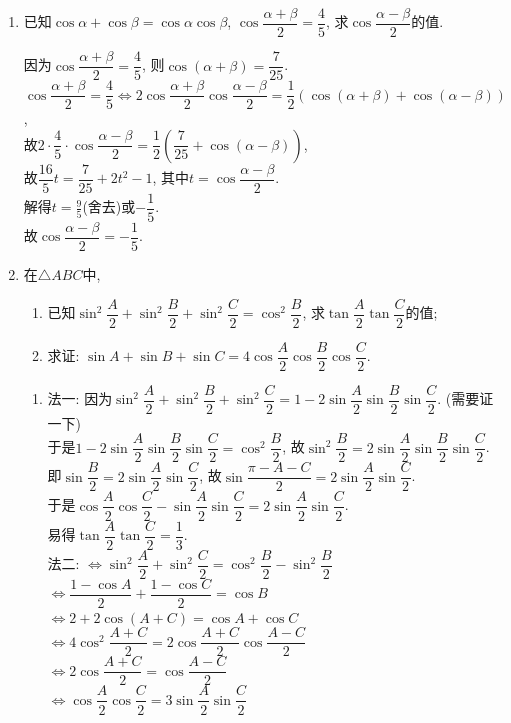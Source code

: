 \begin{enumerate}
\item 已知$\cos\alpha+\cos\beta=\cos\alpha\cos\beta$, $\cos\dfrac{\alpha+\beta}{2}=\dfrac{4}{5}$, 求$\cos\dfrac{\alpha-\beta}{2}$的值. 
\begin{jieda}
因为$\cos\dfrac{\alpha+\beta}{2}=\dfrac{4}{5}$, 则$\cos(\alpha+\beta)=\dfrac{7}{25}$. \\
$\cos\dfrac{\alpha+\beta}{2}=\dfrac{4}{5}\iff 2\cos\dfrac{\alpha+\beta}{2}\cos\dfrac{\alpha-\beta}{2}=\dfrac{1}{2}(\cos(\alpha+\beta)+\cos(\alpha-\beta))$, \\
故$2\cdot\dfrac{4}{5}\cdot\cos\dfrac{\alpha-\beta}{2}=\dfrac{1}{2}\left(\dfrac{7}{25}+\cos(\alpha-\beta)\right)$, \\
故$\dfrac{16}{5}t=\dfrac{7}{25}+2t^2-1$, 其中$t=\cos\dfrac{\alpha-\beta}{2}$. \\
解得$t=\frac{9}{5}$(舍去)或$-\dfrac{1}{5}$. \\
故$\cos\dfrac{\alpha-\beta}{2}=-\dfrac{1}{5}$. 
\end{jieda}


\item 在$\triangle{ABC}$中, 
\begin{enumerate}[(1)]
\item 已知$\sin^2\dfrac{A}{2}+\sin^2\dfrac{B}{2}+\sin^2\dfrac{C}{2}=\cos^2\dfrac{B}{2}$, 求$\tan\dfrac{A}{2}\tan\dfrac{C}{2}$的值; 
\item 求证: $\sin{A}+\sin{B}+\sin{C}=4\cos\dfrac{A}{2}\cos\dfrac{B}{2}\cos\dfrac{C}{2}$. 
\end{enumerate}
\begin{jieda}
\begin{enumerate}[(1)]
\item 法一: 因为$\sin^2\dfrac{A}{2}+\sin^2\dfrac{B}{2}+\sin^2\dfrac{C}{2}=1-2\sin\dfrac{A}{2}\sin\dfrac{B}{2}\sin\dfrac{C}{2}$. (需要证一下)\\
于是$1-2\sin\dfrac{A}{2}\sin\dfrac{B}{2}\sin\dfrac{C}{2}=\cos^2\dfrac{B}{2}$, 故$\sin^2\dfrac{B}{2}=2\sin\dfrac{A}{2}\sin\dfrac{B}{2}\sin\dfrac{C}{2}$. \\
即$\sin\dfrac{B}{2}=2\sin\dfrac{A}{2}\sin\dfrac{C}{2}$, 故$\sin\dfrac{\pi-A-C}{2}=2\sin\dfrac{A}{2}\sin\dfrac{C}{2}$. \\
于是$\cos\dfrac{A}{2}\cos\dfrac{C}{2}-\sin\dfrac{A}{2}\sin\dfrac{C}{2}=2\sin\dfrac{A}{2}\sin\dfrac{C}{2}$. \\
易得$\tan\dfrac{A}{2}\tan\dfrac{C}{2}=\dfrac{1}{3}$. \\
法二: $\iff\sin^2\dfrac{A}{2}+\sin^2\dfrac{C}{2}=\cos^2\dfrac{B}{2}-\sin^2\dfrac{B}{2}$\\
$\iff\dfrac{1-\cos{A}}{2}+\dfrac{1-\cos{C}}{2}=\cos{B}$\\
$\iff 2+2\cos(A+C)=\cos{A}+\cos{C}$\\
$\iff 4\cos^2\dfrac{A+C}{2}=2\cos\dfrac{A+C}{2}\cos\dfrac{A-C}{2}$\\
$\iff 2\cos\dfrac{A+C}{2}=\cos\dfrac{A-C}{2}$\\
$\iff \cos\dfrac{A}{2}\cos\dfrac{C}{2}=3\sin\dfrac{A}{2}\sin\dfrac{C}{2}$


\end{enumerate}
\end{jieda}
\end{enumerate}
